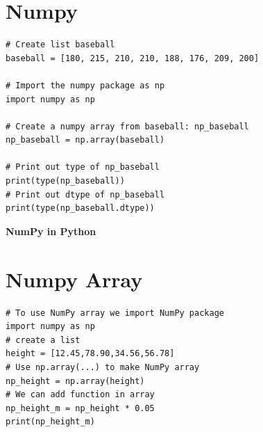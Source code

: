 \documentclass[12pt]{article}
\begin{document}
\section{Numpy}
\begin{lstlisting}
# Create list baseball
baseball = [180, 215, 210, 210, 188, 176, 209, 200]

# Import the numpy package as np
import numpy as np

# Create a numpy array from baseball: np_baseball
np_baseball = np.array(baseball)

# Print out type of np_baseball
print(type(np_baseball))
# Print out dtype of np_baseball
print(type(np_baseball.dtype))
\end{lstlisting}
\pagebreak
\begin{center}
\textbf{NumPy in Python}
\end{center}
\section{Numpy Array}
\begin{lstlisting}
# To use NumPy array we import NumPy package
import numpy as np
# create a list
height = [12.45,78.90,34.56,56.78]
# Use np.array(...) to make NumPy array
np_height = np.array(height)
# We can add function in array
np_height_m = np_height * 0.05
print(np_height_m)
\end{lstlisting}
\end{document}

